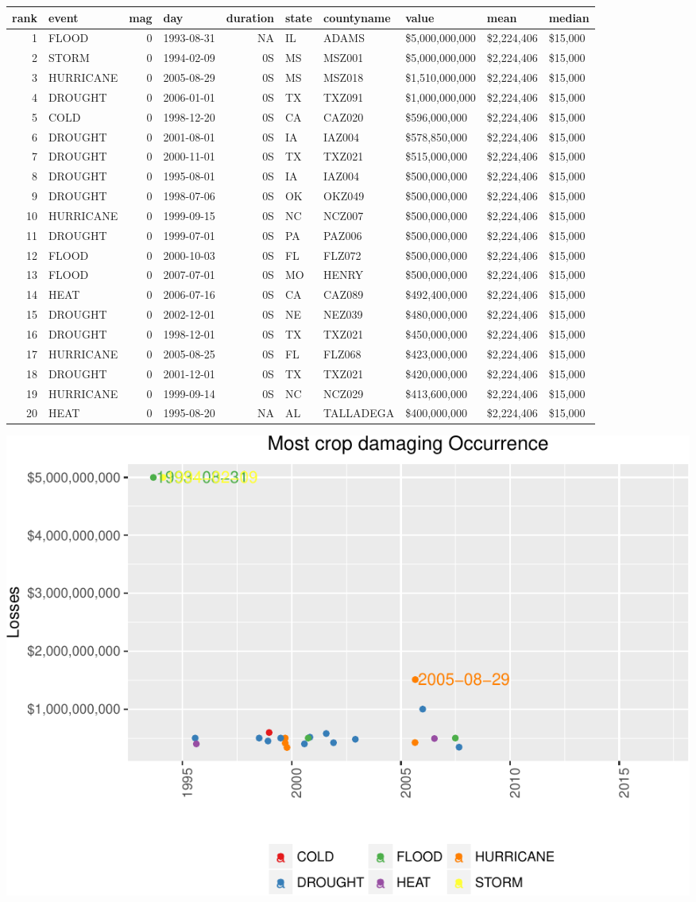 \documentclass[]{article}
\begin{document}
\begin{longtable}[]{@{}rlrlrlllll@{}}
\toprule
rank & event & mag & day & duration & state & countyname & value & mean
& median\tabularnewline
\midrule
\endhead
1 & FLOOD & 0 & 1993-08-31 & NA & IL & ADAMS & \$5,000,000,000 &
\$2,224,406 & \$15,000\tabularnewline
2 & STORM & 0 & 1994-02-09 & 0S & MS & MSZ001 & \$5,000,000,000 &
\$2,224,406 & \$15,000\tabularnewline
3 & HURRICANE & 0 & 2005-08-29 & 0S & MS & MSZ018 & \$1,510,000,000 &
\$2,224,406 & \$15,000\tabularnewline
4 & DROUGHT & 0 & 2006-01-01 & 0S & TX & TXZ091 & \$1,000,000,000 &
\$2,224,406 & \$15,000\tabularnewline
5 & COLD & 0 & 1998-12-20 & 0S & CA & CAZ020 & \$596,000,000 &
\$2,224,406 & \$15,000\tabularnewline
6 & DROUGHT & 0 & 2001-08-01 & 0S & IA & IAZ004 & \$578,850,000 &
\$2,224,406 & \$15,000\tabularnewline
7 & DROUGHT & 0 & 2000-11-01 & 0S & TX & TXZ021 & \$515,000,000 &
\$2,224,406 & \$15,000\tabularnewline
8 & DROUGHT & 0 & 1995-08-01 & 0S & IA & IAZ004 & \$500,000,000 &
\$2,224,406 & \$15,000\tabularnewline
9 & DROUGHT & 0 & 1998-07-06 & 0S & OK & OKZ049 & \$500,000,000 &
\$2,224,406 & \$15,000\tabularnewline
10 & HURRICANE & 0 & 1999-09-15 & 0S & NC & NCZ007 & \$500,000,000 &
\$2,224,406 & \$15,000\tabularnewline
11 & DROUGHT & 0 & 1999-07-01 & 0S & PA & PAZ006 & \$500,000,000 &
\$2,224,406 & \$15,000\tabularnewline
12 & FLOOD & 0 & 2000-10-03 & 0S & FL & FLZ072 & \$500,000,000 &
\$2,224,406 & \$15,000\tabularnewline
13 & FLOOD & 0 & 2007-07-01 & 0S & MO & HENRY & \$500,000,000 &
\$2,224,406 & \$15,000\tabularnewline
14 & HEAT & 0 & 2006-07-16 & 0S & CA & CAZ089 & \$492,400,000 &
\$2,224,406 & \$15,000\tabularnewline
15 & DROUGHT & 0 & 2002-12-01 & 0S & NE & NEZ039 & \$480,000,000 &
\$2,224,406 & \$15,000\tabularnewline
16 & DROUGHT & 0 & 1998-12-01 & 0S & TX & TXZ021 & \$450,000,000 &
\$2,224,406 & \$15,000\tabularnewline
17 & HURRICANE & 0 & 2005-08-25 & 0S & FL & FLZ068 & \$423,000,000 &
\$2,224,406 & \$15,000\tabularnewline
18 & DROUGHT & 0 & 2001-12-01 & 0S & TX & TXZ021 & \$420,000,000 &
\$2,224,406 & \$15,000\tabularnewline
19 & HURRICANE & 0 & 1999-09-14 & 0S & NC & NCZ029 & \$413,600,000 &
\$2,224,406 & \$15,000\tabularnewline
20 & HEAT & 0 & 1995-08-20 & NA & AL & TALLADEGA & \$400,000,000 &
\$2,224,406 & \$15,000\tabularnewline
\bottomrule
\end{longtable}

\includegraphics{readme_files/figure-latex/crop-single-plot-1.pdf}
\end{document}
